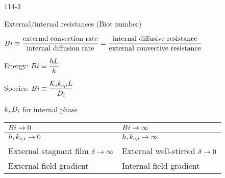 \begin{mitframe}{114-3} 


\begin{listone}

	\item External/internal resistances (Biot number)
    
    \begin{listtwo}
	
    	\item $\biot \equiv \dfrac{\text{external convection rate}}{\text{internal diffusion  rate}}=\dfrac{\text{internal diffusive resistance}}{\text{external convective resistance}}$
        
        \item Energy: $\biot \equiv \dfrac{\planck\length}{\thermcond}$
        
        \item Species: $\biot \equiv \dfrac{\partcoeff\masstranscoeff\length}{\pdiff} $
        
        \item $\thermcond, \pdiff$ for internal phase

	\end{listtwo}

\begin{center}
\begin{tabular}
{| >{\centering\arraybackslash}m{4cm} | >{\centering\arraybackslash}m{4cm} |}
\hline 
 
$\biot \rightarrow 0$ &%
$\biot \rightarrow \infty$\\ \hline

$\planck,\masstranscoeff \rightarrow 0$ &%
$\planck,\masstranscoeff \rightarrow \infty$ \\ \hline

External stagnant film $\blthick \rightarrow \infty$  &%
External well-stirred $\blthick \rightarrow 0$ \\ \hline

External field gradient &%
Internal field gradient \\ \hline    
 
\end{tabular}
\end{center}

\end{listone}

\end{mitframe}